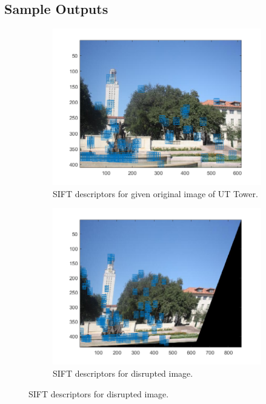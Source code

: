 \documentclass{article}
\begin{document}
\subsection{Sample Outputs}
\begin{figure}[!htb]
\begin{subfigure}{.5\textwidth}
  \centering
  \includegraphics[width=.99\textwidth]{uttower2_sift.png}
  \caption{SIFT descriptors for given original image of UT Tower.}
\end{subfigure}%
\begin{subfigure}{.5\textwidth}
  \centering
  \includegraphics[width=.99\textwidth]{uttower2_bad_sift.png}
  \caption{SIFT descriptors for disrupted image.}
\end{subfigure}

\end{figure}
\end{document}

